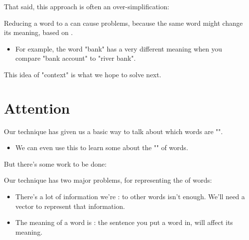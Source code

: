         That said, this approach is often an over-simplification:\\

        \begin{concept}
            Reducing a word to a  can cause problems, because the same word might change its meaning, based on .
        \end{concept}

        \begin{itemize}
            \item \miniex For example, the word "bank" has a very different meaning when you compare "bank account" to "river bank".
        \end{itemize}

        This idea of "context" is what we hope to solve next.

    

\pagebreak
    
\section{Attention}

    Our  technique has given us a basic way to talk about which words are "".

    \begin{itemize}
        \item We can even use this to learn some about the "" of words.
    \end{itemize}

    But there's some work to be done:\\

    \begin{concept}
        Our  technique has two major problems, for representing the  of words:

        \begin{itemize}
            \item There's a lot of information we're :  to other words isn't enough. We'll need a vector to represent that information.
    
            \item The meaning of a word is : the sentence you put a word in, will affect its meaning.
        \end{itemize}
    \end{concept}

